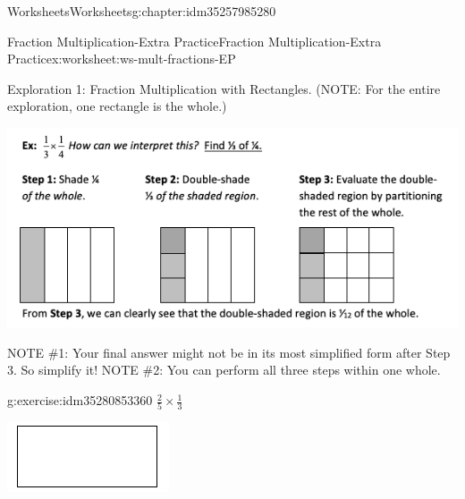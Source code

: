\documentclass[twoside,11pt,]{book}
\begin{document}
\begin{chapterptx}{Worksheets}{}{Worksheets}{}{}{g:chapter:idm35257985280}
%
\begin{worksheet-section-numberless}{Fraction Multiplication-Extra Practice}{}{Fraction Multiplication-Extra Practice}{}{}{x:worksheet:ws-mult-fractions-EP}
\begin{introduction}{}%
Exploration 1: Fraction Multiplication with Rectangles. (NOTE: For the entire exploration, one rectangle is the whole.)%
\begin{sidebyside}{1}{0}{0}{0}%
\begin{sbspanel}{1}%
\includegraphics[width=1\linewidth]{images/frac-mult-rect.png}
\end{sbspanel}%
\end{sidebyside}%
\par
NOTE \#1: Your final answer might not be in its most simplified form after Step 3. So simplify it! NOTE \#2: You can perform all three steps within one whole.%
\end{introduction}%
\begin{divisionexercise}{1}{}{}{g:exercise:idm35280853360}%
\(\frac{2}{5} \times \frac{1}{3} \)%
\begin{sidebyside}{1}{0.2}{0.2}{0}%
\begin{sbspanel}{0.6}%
\includegraphics[width=1\linewidth]{images/generic-rectangle.png}
\end{sbspanel}%
\end{sidebyside}%

\end{divisionexercise}
\end{worksheet-section-numberless}
\end{chapterptx}
\end{document}
